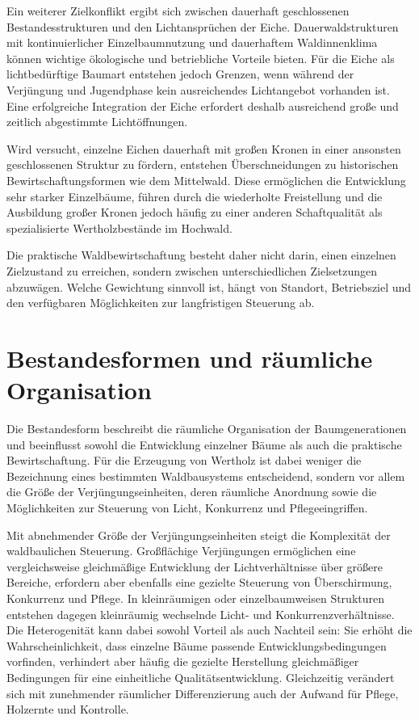\documentclass[twocolumn, bibliography=totoc, abstract=true]{scrartcl}
\begin{document}
Ein weiterer Zielkonflikt ergibt sich zwischen dauerhaft geschlossenen Bestandesstrukturen und den Lichtansprüchen der Eiche. Dauerwaldstrukturen mit kontinuierlicher Einzelbaumnutzung und dauerhaftem Waldinnenklima können wichtige ökologische und betriebliche Vorteile bieten. Für die Eiche als lichtbedürftige Baumart entstehen jedoch Grenzen, wenn während der Verjüngung und Jugendphase kein ausreichendes Lichtangebot vorhanden ist. Eine erfolgreiche Integration der Eiche erfordert deshalb ausreichend große und zeitlich abgestimmte Lichtöffnungen.

Wird versucht, einzelne Eichen dauerhaft mit großen Kronen in einer ansonsten geschlossenen Struktur zu fördern, entstehen Überschneidungen zu historischen Bewirtschaftungsformen wie dem Mittelwald. Diese ermöglichen die Entwicklung sehr starker Einzelbäume, führen durch die wiederholte Freistellung und die Ausbildung großer Kronen jedoch häufig zu einer anderen Schaftqualität als spezialisierte Wertholzbestände im Hochwald.

Die praktische Waldbewirtschaftung besteht daher nicht darin, einen einzelnen Zielzustand zu erreichen, sondern zwischen unterschiedlichen Zielsetzungen abzuwägen. Welche Gewichtung sinnvoll ist, hängt von Standort, Betriebsziel und den verfügbaren Möglichkeiten zur langfristigen Steuerung ab.


\section{Bestandesformen und räumliche Organisation}

Die Bestandesform beschreibt die räumliche Organisation der Baumgenerationen und beeinflusst sowohl die Entwicklung einzelner Bäume als auch die praktische Bewirtschaftung. Für die Erzeugung von Wertholz ist dabei weniger die Bezeichnung eines bestimmten Waldbausystems entscheidend, sondern vor allem die Größe der Verjüngungseinheiten, deren räumliche Anordnung sowie die Möglichkeiten zur Steuerung von Licht, Konkurrenz und Pflegeeingriffen.

Mit abnehmender Größe der Verjüngungseinheiten steigt die Komplexität der waldbaulichen Steuerung. Großflächige Verjüngungen ermöglichen eine vergleichsweise gleichmäßige Entwicklung der Lichtverhältnisse über größere Bereiche, erfordern aber ebenfalls eine gezielte Steuerung von Überschirmung, Konkurrenz und Pflege. In kleinräumigen oder einzelbaumweisen Strukturen entstehen dagegen kleinräumig wechselnde Licht- und Konkurrenzverhältnisse. Die Heterogenität kann dabei sowohl Vorteil als auch Nachteil sein: Sie erhöht die Wahrscheinlichkeit, dass einzelne Bäume passende Entwicklungsbedingungen vorfinden, verhindert aber häufig die gezielte Herstellung gleichmäßiger Bedingungen für eine einheitliche Qualitätsentwicklung. Gleichzeitig verändert sich mit zunehmender räumlicher Differenzierung auch der Aufwand für Pflege, Holzernte und Kontrolle.
\end{document}
